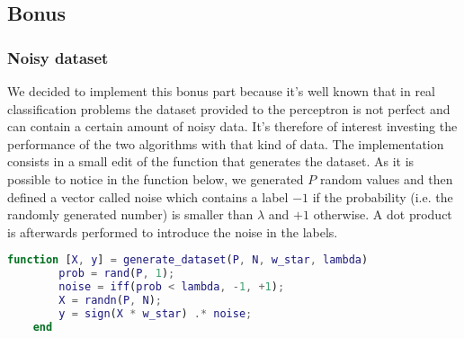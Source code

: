 \subsection{Bonus}
\subsubsection{Noisy dataset}
We decided to implement this bonus part because it's well known that in real classification problems the dataset provided to the perceptron is not perfect and can contain a certain
amount of noisy data. It's therefore of interest investing the performance of the two algorithms with that kind of data. The implementation consists in a small edit of the function
that generates the dataset. As it is possible to notice in the function below, we generated $P$ random values and then defined a vector called noise which contains
a label $-1$ if the probability (i.e. the randomly generated number) is smaller than $\lambda$ and $+1$ otherwise. A dot product is afterwards performed to introduce the noise in
the labels. 

\begin{lstlisting}[language=Matlab]
    function [X, y] = generate_dataset(P, N, w_star, lambda)
        prob = rand(P, 1);
        noise = iff(prob < lambda, -1, +1);
        X = randn(P, N);
        y = sign(X * w_star) .* noise;
    end
\end{lstlisting}